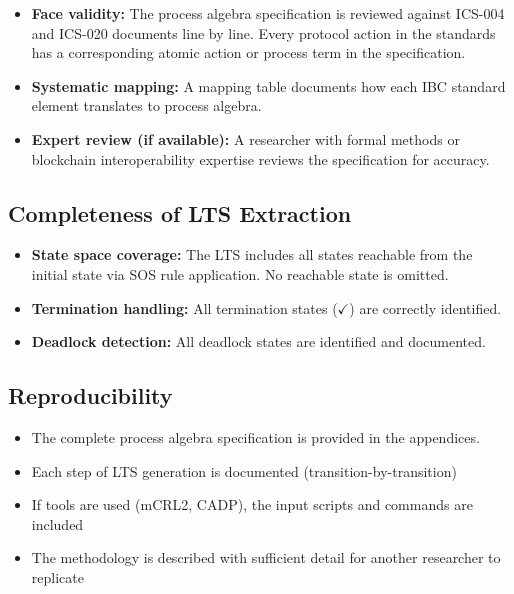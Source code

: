 \begin{itemize}
    \item \textbf{Face validity:} The process algebra specification is reviewed against ICS-004 and ICS-020 documents line by line. Every protocol action in the standards has a corresponding atomic action or process term in the specification.
    \item \textbf{Systematic mapping:} A mapping table documents how each IBC standard element translates to process algebra.
    \item \textbf{Expert review (if available):} A researcher with formal methods or blockchain interoperability expertise reviews the specification for accuracy.
\end{itemize}

\subsection{Completeness of LTS
Extraction}\label{completeness-of-lts-extraction}

\begin{itemize}
    \item \textbf{State space coverage:} The LTS includes all states reachable from the initial state via SOS rule application. No reachable state is omitted.
    \item \textbf{Termination handling:} All termination states (\(\checkmark\)) are correctly identified.
    \item \textbf{Deadlock detection:} All deadlock states are identified and documented.
\end{itemize}

\subsection{Reproducibility}\label{reproducibility}

\begin{itemize}
    \item The complete process algebra specification is provided in the appendices.
    \item Each step of LTS generation is documented (transition-by-transition)
    \item If tools are used (mCRL2, CADP), the input scripts and commands are included
    \item The methodology is described with sufficient detail for another researcher to replicate
\end{itemize}

